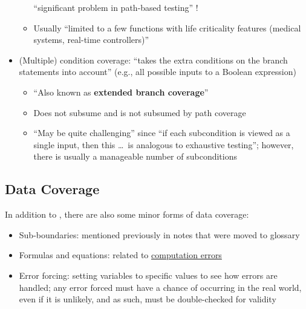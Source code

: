 \begin{itemize}
\begin{itemize}
                    ``significant problem in path-based testing''
                    \citep[p.~5-5]{SWEBOK2024}!
              \item Usually ``limited to a few functions with life
                    criticality features (medical systems, real-time
                    controllers)'' \citep[p.~481]{PetersAndPedrycz2000}
          \end{itemize}
    \item (Multiple) condition coverage: ``takes the extra conditions on the
          branch statements into account'' (e.g., all possible inputs to a
          Boolean expression) \citep[p.~120]{Patton2006}
          \begin{itemize}
              \item ``Also known as \textbf{extended branch coverage}''
                    \citep[p.~422]{vanVliet2000}
              \item Does not subsume and is not subsumed by path coverage
                    \citep[p.~433]{vanVliet2000}
              \item ``May be quite challenging'' since ``if each
                    subcondition is viewed as a single input, then this
                    \dots\ is analogous to exhaustive testing''; however,
                    there is usually a manageable number of subconditions
                    \citep[p.~464]{PetersAndPedrycz2000}
          \end{itemize}
\end{itemize}

\subsection[Data Coverage]{Data Coverage \citep[pp.~114-116]{Patton2006}}

In addition to , there are also some minor forms of
data coverage:

\begin{itemize}
    \item Sub-boundaries: mentioned previously in notes that were moved to
          glossary
    \item Formulas and equations: related to
          \hyperref[comp-errors]{computation errors}
    \item Error forcing: setting variables to specific values to see how
          errors are handled; any error forced must have a chance of
          occurring in the real world, even if it is unlikely, and as such,
          must be double-checked for validity
          \citep[p.~116]{Patton2006}
\end{itemize}

